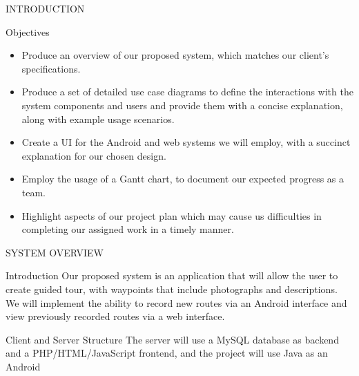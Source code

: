 \documentclass{article}
\begin{document}
\begin{section}{INTRODUCTION}
\begin{subsection}{Objectives}
			\begin{itemize}
				\item{Produce an overview of our proposed system, which matches our client's specifications.}
				\item{Produce a set of detailed use case diagrams to define the interactions with the system components and users and provide them with a concise explanation, along with example usage scenarios.}
				\item{Create a UI for the Android and web systems we will employ, with a succinct explanation for our chosen design.}
				\item{Employ the usage of a Gantt chart, to document our expected progress as a team.}
				\item{Highlight aspects of our project plan which may cause us difficulties in completing our assigned work in a timely manner.}
			\end{itemize}
		\end{subsection}
	\end{section}

	\newpage
	\begin{section}{SYSTEM OVERVIEW}
		\begin{subsection}{Introduction}
			Our proposed system is an application that will allow the user to create guided tour, with waypoints that include photographs and descriptions. We will implement the ability to record new routes via an Android interface and view previously recorded routes via a web interface.
		\end{subsection}
		
		\begin{subsection}{Client and Server Structure}
			The server will use a MySQL database as backend and a PHP/HTML/JavaScript frontend, and the project will use Java as an Android 
		\end{subsection}
	\end{section}
	
\end{document}
